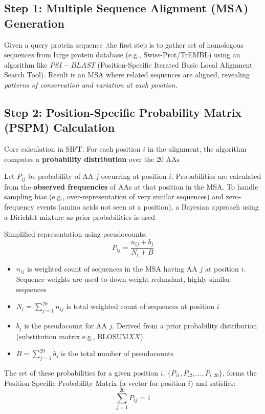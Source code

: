 \documentclass[../main.tex]{subfiles}
\begin{document}
\subsection{Step 1: Multiple Sequence Alignment (MSA) Generation}

Given a query protein sequence ,the first step is to gather set of homologous sequences from large protein database (e.g., Swiss-Prot/TrEMBL) using an algorithm like $PSI-BLAST$ (Position-Specific Iterated Basic Local Alignment Search Tool). Result is an MSA where related sequences are aligned, revealing \textit{patterns of conservation and variation at each position.}

\subsection{Step 2: Position-Specific Probability Matrix (PSPM) Calculation}

Core calculation in SIFT. For each position $i$ in the alignment, the algorithm computes a \textbf{probability distribution} over the $20$ AAs

Let $P_{ij}$ be probability of AA $j$ occurring at position $i$. Probabilities are calculated from the \textbf{observed frequencies} of AAs at that position in the MSA. To handle sampling bias (e.g., over-representation of very similar sequences) and zero-frequency events (amino acids not seen at a position), a Bayesian approach using a Dirichlet mixture as prior probabilities is used

Simplified  representation using pseudocounts:
\begin{equation}
P_{ij} = \frac{n_{ij} + b_j}{N_i + B}
\end{equation}
\begin{itemize}
    \item $n_{ij}$ is weighted count of sequences in the MSA having AA $j$ at position $i$. Sequence weights are used to down-weight redundant, highly similar sequences
    \item $N_i = \sum_{j=1}^{20} n_{ij}$ is total weighted count of sequences at position $i$
    \item $b_j$ is the pseudocount for AA $j$. Derived from a prior probability distribution (substitution matrix e.g., BLOSUM$XX$)
    \item $B = \sum_{j=1}^{20} b_j$ is the total number of pseudocounts
\end{itemize}
The set of these probabilities for a given position $i$, $\{P_{i1}, P_{i2}, \dots, P_{i,20}\}$, forms the Position-Specific Probability Matrix (a vector for position $i$) and satisfies:
\begin{equation}
\sum_{j=1}^{20} P_{ij} = 1
\end{equation}
\end{document}
